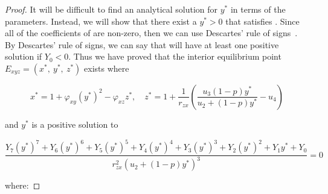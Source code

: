 \begin{proof}
    It will be difficult to find an analytical solution for $y^*$ in terms of the parameters. Instead, we will show that there exist a $y^*>0$ that satisfies . Since all of the coefficients of  are non-zero, then we can use Descartes' rule of signs~\cite{WANG2004525526}. By Descartes' rule of signs, we can say that  will have at least one positive solution if $Y_0<0$. Thus we have proved that the interior equilibrium point $E_{xyz}=\left(x^*,\ y^*,\ z^*\right)$ exists where
    
    \begin{equation*}
        x^*=1+\varphi_{xy}\left(y^*\right)^2-\varphi_{xz}z^*,\quad z^*=1+\frac{1}{r_{zx}}\left(\frac{u_3\left(1-p\right)y^*}{u_2+\left(1-p\right)y^*}-u_4\right)
    \end{equation*}

    and $y^*$ is a positive solution to 

    \begin{equation*}
        \frac{Y_7\left(y^*\right)^7+Y_6\left(y^*\right)^6+Y_5\left(y^*\right)^5+Y_4\left(y^*\right)^4+Y_3\left(y^*\right)^3+Y_2\left(y^*\right)^2+Y_1y^*+Y_0}{r_{zx}^2\left(u_2+\left(1-p\right)y^*\right)^3}=0
    \end{equation*}

    where:


\end{proof}
